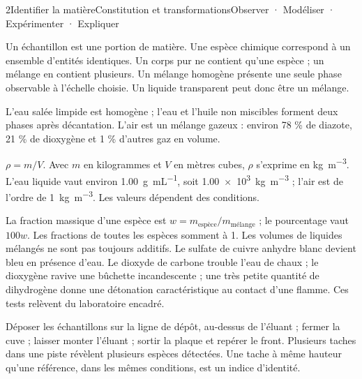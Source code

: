 \begin{ouverture}[molecules]{2}{Identifier la matière}{Constitution et transformations}{Observer · Modéliser · Expérimenter · Expliquer}
\end{ouverture}
\essentiel
{}
Un échantillon est une portion de matière. Une espèce chimique correspond à un ensemble d'entités identiques. Un corps pur ne contient qu'une espèce ; un mélange en contient plusieurs. Un mélange homogène présente une seule phase observable à l'échelle choisie. Un liquide transparent peut donc être un mélange.
\begin{exemple}L'eau salée limpide est homogène ; l'eau et l'huile non miscibles forment deux phases après décantation. L'air est un mélange gazeux : environ 78 \% de diazote, 21 \% de dioxygène et 1 \% d'autres gaz en volume.\end{exemple}
\begin{definition}$\rho=m/V$. Avec $m$ en kilogrammes et $V$ en mètres cubes, $\rho$ s'exprime en \unit{kg.m^{-3}}. L'eau liquide vaut environ \qty{1,00}{g.mL^{-1}}, soit \qty{1,00e3}{kg.m^{-3}} ; l'air est de l'ordre de \qty{1}{kg.m^{-3}}. Les valeurs dépendent des conditions.\end{definition}
La fraction massique d'une espèce est $w=m_{\mathrm{espèce}}/m_{\mathrm{mélange}}$ ; le pourcentage vaut $100w$. Les fractions de toutes les espèces somment à 1. Les volumes de liquides mélangés ne sont pas toujours additifs.
Le sulfate de cuivre anhydre blanc devient bleu en présence d'eau. Le dioxyde de carbone trouble l'eau de chaux ; le dioxygène ravive une bûchette incandescente ; une très petite quantité de dihydrogène donne une détonation caractéristique au contact d'une flamme. Ces tests relèvent du laboratoire encadré.
\begin{savoirfaire}Déposer les échantillons sur la ligne de dépôt, au-dessus de l'éluant ; fermer la cuve ; laisser monter l'éluant ; sortir la plaque et repérer le front. Plusieurs taches dans une piste révèlent plusieurs espèces détectées. Une tache à même hauteur qu'une référence, dans les mêmes conditions, est un indice d'identité.\end{savoirfaire}
